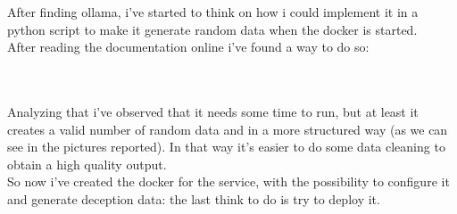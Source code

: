 After finding ollama, i've started to think on how i could implement it in a python script to make it generate random data when the docker is started.
\\
After reading the documentation online i've found a way to do so:
\begin{mdframed}[backgroundcolor=bpy]

\end{mdframed}
\\\\
Analyzing that i've observed that it needs some time to run, but at least it creates a valid number of random data and in a more structured way (as we can see in the pictures reported). In that way it's easier to do some data cleaning to obtain a high quality output. 
\\
So now i've created the docker for the service, with the possibility to configure it and generate deception data: the last think to do is try to deploy it.
